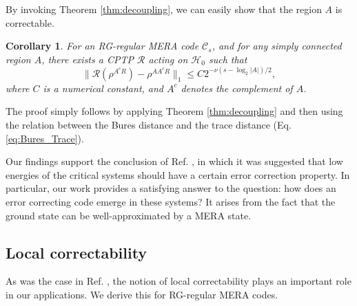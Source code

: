 \documentclass[a4paper,11pt]{article}
\newcommand{\1}{\mathbbm{1}}
\newcommand{\cC}{\mathcal{C}}
\newtheorem{corollary}{Corollary}
\begin{document}
By invoking Theorem \ref{thm:decoupling}, we can easily show that the region $A$ is correctable.
\begin{corollary}
	For an RG-regular MERA code $\cC_s$, and for any simply connected region $A$, there exists a CPTP $\mathcal{R}$ acting on $\mathcal{H}_0$ such that
	\begin{equation}
		\|\mathcal{R}(\rho^{A^cR}) - \rho^{AA^cR} \|_1 \leq C2^{-\nu(s-\log_2|A|)/2},
	\end{equation}
	where $C$ is a numerical constant, and $A^c$ denotes the complement of $A$.
\end{corollary}
The proof simply follows by applying Theorem \ref{thm:decoupling} and then using the relation between the Bures distance and the trace distance (Eq.\ref{eq:Bures_Trace}).

Our findings support the conclusion of Ref. \cite{Pastawski2016}, in which it was suggested that low energies of the critical systems should have a certain error correction
property. In particular, our work provides a satisfying answer to the question: how does an error correcting code emerge in these systems? It arises from the fact that
the ground state can be well-approximated by a MERA state.


\subsection{Local correctability}
As was the case in Ref. \cite{Flammia2016}, the notion of local correctability plays an important role in our applications. We derive this for RG-regular MERA codes.
\end{document}
